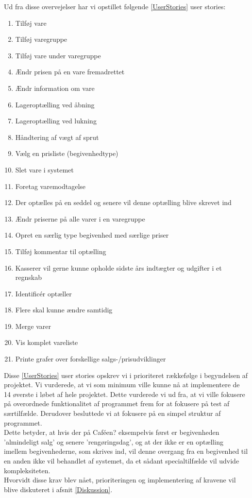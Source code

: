 \documentclass[]{article}
\begin{document}
Ud fra disse overvejelser har vi opstillet følgende \ref{UserStories} user stories:
\begin{enumerate}
	\setlength{\itemsep}{-3pt}
	\item Tilføj vare 
	\item Tilføj varegruppe
	\item Tilføj vare under varegruppe
	\item Ændr prisen på en vare fremadrettet
	\item Ændr information om vare
	\item Lageroptælling ved åbning
	\item Lageroptælling ved lukning
	\item Håndtering af vægt af sprut
	\item Vælg en prisliste (begivenhedtype)
	\item Slet vare i systemet
	\item Foretag varemodtagelse
	\item Der optælles på en seddel og senere vil denne optælling blive skrevet ind
	\item Ændr priserne på alle varer i en varegruppe
	\item Opret en særlig type begivenhed med særlige priser
	\item Tilføj kommentar til optælling
	\item Kasserer vil gerne kunne opholde sidste års indtægter og udgifter i et regnskab
	\item Identificér optæller
	\item Flere skal kunne ændre samtidig
	\item Merge varer
	\item Vis komplet vareliste
	\item Printe grafer over forskellige salgs-/prisudviklinger
	\label{UserStories}
\end{enumerate}
Disse \ref{UserStories} user stories opskrev vi i prioriteret rækkefølge i begyndelsen af projektet. Vi vurderede, at vi som minimum ville kunne nå at implementere de 14 øverste i løbet af hele projektet. Dette vurderede vi ud fra, at vi ville fokusere på overordnede funktionalitet af programmet frem for at fokusere på test af særtilfælde. Derudover besluttede vi at fokusere på en simpel struktur af programmet. \\
Dette betyder, at hvis der på Caféen? eksempelvis først er begivenheden 'almindeligt salg' og senere 'rengøringsdag', og at der ikke er en optælling imellem begivenhederne, som skrives ind, vil denne overgang fra en begivenhed til en anden ikke vil behandlet af systemet, da et sådant specialtilfælde vil udvide kompleksiteten. \\
Hvorvidt disse krav blev nået, prioriteringen og implementering af kravene vil blive diskuteret i afsnit \ref{Diskussion}.
\end{document}

